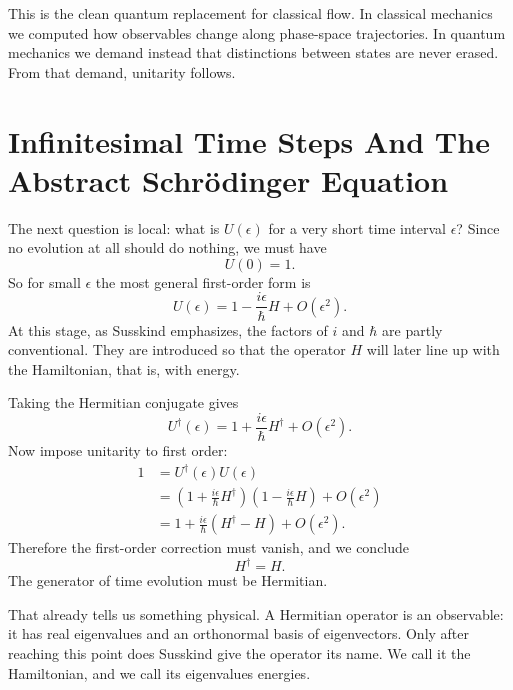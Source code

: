 This is the clean quantum replacement for classical flow. In classical mechanics we computed how observables change along phase-space trajectories. In quantum mechanics we demand instead that distinctions between states are never erased. From that demand, unitarity follows.

\section{Infinitesimal Time Steps And The Abstract Schr\"odinger Equation}

The next question is local: what is $U(\epsilon)$ for a very short time interval $\epsilon$? Since no evolution at all should do nothing, we must have
\begin{equation}
U(0)=1.
\end{equation}
So for small $\epsilon$ the most general first-order form is
\begin{equation}
U(\epsilon)=1-\frac{i\epsilon}{\hbar}H+O(\epsilon^2).
\end{equation}
At this stage, as Susskind emphasizes, the factors of $i$ and $\hbar$ are partly conventional. They are introduced so that the operator $H$ will later line up with the Hamiltonian, that is, with energy.

Taking the Hermitian conjugate gives
\begin{equation}
U^\dagger(\epsilon)=1+\frac{i\epsilon}{\hbar}H^\dagger+O(\epsilon^2).
\end{equation}
Now impose unitarity to first order:
\begin{align}
1
&=U^\dagger(\epsilon)U(\epsilon) \\
&=\left(1+\frac{i\epsilon}{\hbar}H^\dagger\right)
  \left(1-\frac{i\epsilon}{\hbar}H\right)+O(\epsilon^2) \\
&=1+\frac{i\epsilon}{\hbar}(H^\dagger-H)+O(\epsilon^2).
\end{align}
Therefore the first-order correction must vanish, and we conclude
\begin{equation}
H^\dagger=H.
\end{equation}
The generator of time evolution must be Hermitian.

That already tells us something physical. A Hermitian operator is an observable: it has real eigenvalues and an orthonormal basis of eigenvectors. Only after reaching this point does Susskind give the operator its name. We call it the Hamiltonian, and we call its eigenvalues energies.

